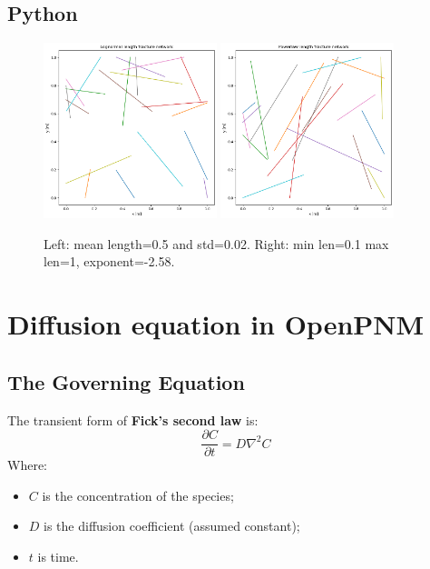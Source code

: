 \documentclass{article}
\begin{document}
\subsection{Python}
\begin{figure}[htbp!]
    \centering
    \includegraphics[width=0.45\textwidth]{images/LognormalFrac.png}
    \hspace{0.05\textwidth}
    \includegraphics[width=0.45\textwidth]{images/PowerlawFrac.png}
    \caption{Left: mean length=0.5 and std=0.02. Right: min len=0.1 max len=1, exponent=-2.58.}
    \label{fig:LengthDistPy}
\end{figure}

\FloatBarrier  %
\section{Diffusion equation in OpenPNM}

\subsection{The Governing Equation}
The transient form of \textbf{Fick's second law} is:
\begin{equation}
    \frac{\partial C}{\partial t} = D \nabla^2 C
\end{equation}
Where:
\begin{itemize}
    \item $C$ is the concentration of the species;
    \item $D$ is the diffusion coefficient (assumed constant);
    \item $t$ is time.
\end{itemize}
\end{document}
